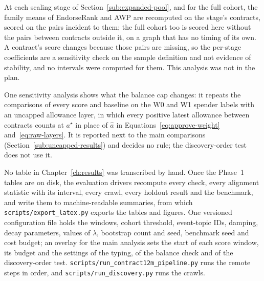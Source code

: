 At each scaling stage of Section~\ref{sub:expanded-pool}, and for the full cohort, the family means of EndorseRank and AWP are recomputed on the stage's contracts, scored on the pairs incident to them; the full cohort too is scored here without the pairs between contracts outside it, on a graph that has no timing of its own. A contract's score changes because those pairs are missing, so the per-stage coefficients are a sensitivity check on the sample definition and not evidence of stability, and no intervals were computed for them. This analysis was not in the plan.


One sensitivity analysis shows what the balance cap changes: it repeats the comparisons of every score and baseline on the W0 and W1 spender labels with an uncapped allowance layer, in which every positive latest allowance between contracts counts at $a^{\star}$ in place of $\hat a$ in Equations~\eqref{eq:approve-weight} and~\eqref{eq:raw-layers}. It is reported next to the main comparisons (Section~\ref{sub:uncapped-results}) and decides no rule; the discovery-order test does not use it.


No table in Chapter~\ref{ch:results} was transcribed by hand. Once the Phase~1 tables are on disk, the evaluation drivers recompute every check, every alignment statistic with its interval, every crawl, every holdout result and the benchmark, and write them to machine-readable summaries, from which \texttt{scripts/export\_latex.py} exports the tables and figures. One versioned configuration file holds the windows, cohort threshold, event-topic IDs, damping, decay parameters, values of $\lambda$, bootstrap count and seed, benchmark seed and cost budget; an overlay for the main analysis sets the start of each score window, its budget and the settings of the typing, of the balance check and of the discovery-order test. \texttt{scripts/run\_contract12m\_pipeline.py} runs the remote steps in order, and \texttt{scripts/run\_discovery.py} runs the crawls.


